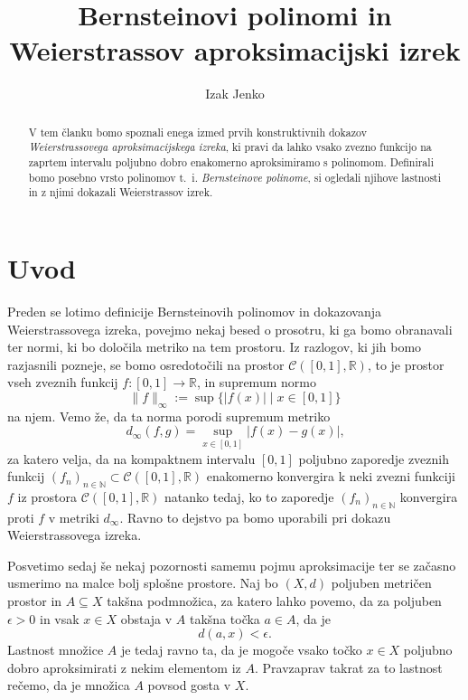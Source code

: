 \documentclass[a4paper, reqno]{amsart}
\theoremstyle{theorem}
\theoremstyle{definition}
\begin{document}
\title{Bernsteinovi polinomi in Weierstrassov aproksimacijski izrek}
\author{Izak Jenko}

\maketitle
\thispagestyle{empty}

\begin{abstract}
	V tem članku bomo spoznali enega izmed prvih konstruktivnih dokazov 
	\emph{Weierstrassovega aproksimacijskega izreka}, ki pravi da lahko vsako zvezno 
	funkcijo na zaprtem intervalu poljubno dobro enakomerno aproksimiramo s polinomom. 
	Definirali bomo posebno vrsto polinomov t.~i. \emph{Bernsteinove polinome}, si ogledali
	njihove lastnosti in z njimi dokazali Weierstrassov izrek.
\end{abstract}

\newcommand{\RR}{\mathbb{R}}
\newcommand{\NN}{\mathbb{N}}
\newcommand{\CIR}{\mathcal{C}([0,1],\RR)}
\newcommand{\dinf}{d_{\infty}}

\section{Uvod}

\par
Preden se lotimo definicije Bernsteinovih polinomov in dokazovanja Weierstrassovega
izreka, povejmo nekaj besed o prosotru, ki ga bomo obranavali ter normi, ki bo
določila metriko na tem prostoru. Iz razlogov, ki jih bomo razjasnili pozneje, se bomo
osredotočili na prostor $\mathcal{C}([0,1],\mathbb{R})$, to je prostor vseh zveznih
funkcij $f: [0,1] \to \RR$, in supremum normo
$$\|f\|_{\infty} := \sup \{|f(x)|\mid x \in [0,1]\}$$
na njem. Vemo že, da ta norma porodi supremum metriko
$$\dinf (f, g) = 
\sup_{x \in [0,1]} |f(x) - g(x)| \text{,}$$
za katero velja, da na kompaktnem intervalu $[0,1]$ poljubno zaporedje zveznih funkcij 
$(f_n)_{n \in \NN} \subset \CIR$ enakomerno konvergira k neki zvezni funkciji 
$f$ iz prostora $\CIR$
natanko tedaj, ko to zaporedje $(f_n)_{n \in \NN}$ konvergira proti $f$ v metriki $\dinf$.
Ravno to dejstvo pa bomo uporabili pri dokazu Weierstrassovega izreka. 
\par
Posvetimo sedaj še nekaj pozornosti samemu pojmu aproksimacije ter se začasno usmerimo
na malce bolj splošne prostore. Naj bo $(X, d)$ poljuben metričen prostor in $A \subseteq X$
takšna podmnožica, za katero lahko povemo, da za poljuben $\epsilon > 0$ in vsak $x \in X$ 
obstaja v $A$ takšna točka $a \in A$, da je $$d(a, x) < \epsilon\text{.}$$ Lastnost množice
$A$ je tedaj ravno ta, da je mogoče vsako točko $x \in X$ poljubno dobro aproksimirati
z nekim elementom iz $A$. Pravzaprav takrat za to lastnost rečemo, da je množica $A$
povsod gosta v $X$. 
\end{document}
